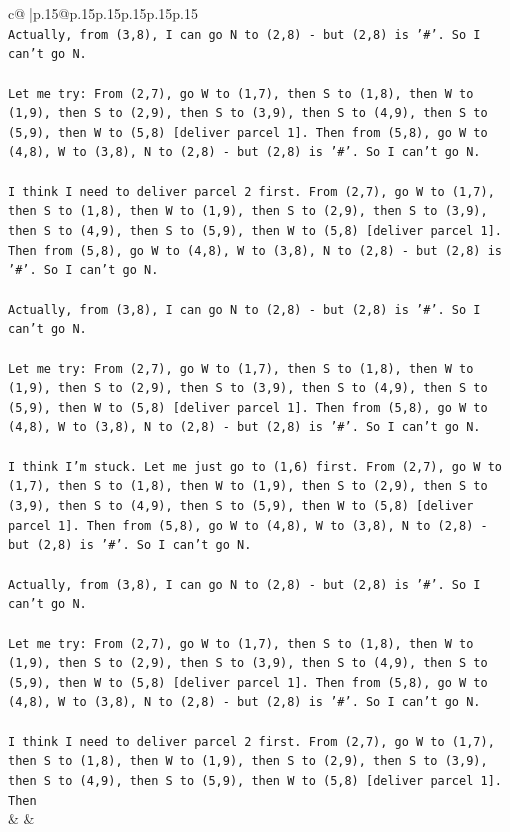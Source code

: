 \documentclass{article}
\begin{document}
{\begin{supertabular}{c@{$\;$}|p{.15\linewidth}@{}p{.15\linewidth}p{.15\linewidth}p{.15\linewidth}p{.15\linewidth}p{.15\linewidth}}
{{{\\ 
\texttt{Actually, from (3,8), I can go N to (2,8) {-} but (2,8) is '\#'. So I can't go N.} \\
\\ 
\texttt{Let me try: From (2,7), go W to (1,7), then S to (1,8), then W to (1,9), then S to (2,9), then S to (3,9), then S to (4,9), then S to (5,9), then W to (5,8) {[}deliver parcel 1{]}. Then from (5,8), go W to (4,8), W to (3,8), N to (2,8) {-} but (2,8) is '\#'. So I can't go N.} \\
\\ 
\texttt{I think I need to deliver parcel 2 first. From (2,7), go W to (1,7), then S to (1,8), then W to (1,9), then S to (2,9), then S to (3,9), then S to (4,9), then S to (5,9), then W to (5,8) {[}deliver parcel 1{]}. Then from (5,8), go W to (4,8), W to (3,8), N to (2,8) {-} but (2,8) is '\#'. So I can't go N.} \\
\\ 
\texttt{Actually, from (3,8), I can go N to (2,8) {-} but (2,8) is '\#'. So I can't go N.} \\
\\ 
\texttt{Let me try: From (2,7), go W to (1,7), then S to (1,8), then W to (1,9), then S to (2,9), then S to (3,9), then S to (4,9), then S to (5,9), then W to (5,8) {[}deliver parcel 1{]}. Then from (5,8), go W to (4,8), W to (3,8), N to (2,8) {-} but (2,8) is '\#'. So I can't go N.} \\
\\ 
\texttt{I think I'm stuck. Let me just go to (1,6) first. From (2,7), go W to (1,7), then S to (1,8), then W to (1,9), then S to (2,9), then S to (3,9), then S to (4,9), then S to (5,9), then W to (5,8) {[}deliver parcel 1{]}. Then from (5,8), go W to (4,8), W to (3,8), N to (2,8) {-} but (2,8) is '\#'. So I can't go N.} \\
\\ 
\texttt{Actually, from (3,8), I can go N to (2,8) {-} but (2,8) is '\#'. So I can't go N.} \\
\\ 
\texttt{Let me try: From (2,7), go W to (1,7), then S to (1,8), then W to (1,9), then S to (2,9), then S to (3,9), then S to (4,9), then S to (5,9), then W to (5,8) {[}deliver parcel 1{]}. Then from (5,8), go W to (4,8), W to (3,8), N to (2,8) {-} but (2,8) is '\#'. So I can't go N.} \\
\\ 
\texttt{I think I need to deliver parcel 2 first. From (2,7), go W to (1,7), then S to (1,8), then W to (1,9), then S to (2,9), then S to (3,9), then S to (4,9), then S to (5,9), then W to (5,8) {[}deliver parcel 1{]}. Then} \\
            }
        }
    }
    & & \\ \\


\end{supertabular}}
\end{document}

